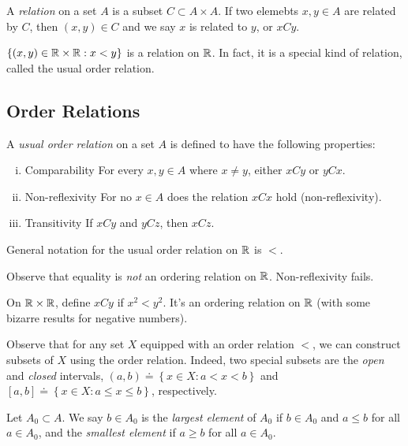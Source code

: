 \begin{definition}
	A \emph{relation} on a set $A$ is a subset $C \subset A \times A$.
	If two elemebts $x, y \in A$ are related by $C$, then $(x,y) \in C$ and 
	we say $x$ is related to $y$, or $xCy$.
\end{definition}
\begin{example}
	$\left\{ (x,y) \in \mathbb{R} \times \mathbb{R}: x<y \right\}$ is a relation on $\mathbb{R}$.
	In fact, it is a special kind of relation, called the usual order relation.
\end{example}

\subsection{Order Relations} 
\begin{definition}
	A \emph{usual order relation } on a set $A$ is defined to have the following
	properties:
	\begin{enumerate}[(i)]
		\item{Comparability} For every $x,y \in A$ where $x \neq y$, either $xCy$ or $yCx$.
		\item{Non-reflexivity} For no $x \in A$ does the relation $xCx$ hold (non-reflexivity).
		\item{Transitivity} If $xCy$ and $yCz$, then $xCz$.
	\end{enumerate}
	General notation for the usual order relation on $\mathbb{R}$ is $<$.
\end{definition}
\begin{remark}\label{rem:}
	Observe that equality is \emph{not} an ordering relation on $\mathbb{R}$. Non-reflexivity
	fails.
\end{remark}
\begin{example}
	On $\mathbb{R} \times \mathbb{R}$, define $xCy$ if $x^{2} < y^{2}$. It's an ordering
	relation on $\mathbb{R}$ (with some bizarre results for negative numbers).
\end{example}
Observe that for any set $X$ equipped with an order relation $<$, we can
construct subsets of $X$ using the order relation. Indeed, two special
subsets are the \emph{open} and \emph{closed} intervals,
$(a,b)\doteq \left\{ x \in X: a < x < b \right\}$ and $[a,b] \doteq \left\{ x
	\in X: a \le x \le b
\right\}$, respectively.

Let $A_{0}  \subset A$. We say $b \in A_{0}$ is the \emph{largest element} of
$A_{0}$ if $b \in A_{0}$ and $a \le b$ for all $a \in A_{0}$, and the 
\emph{smallest element} if $a \ge b$ for all $a \in A_{0}$.

